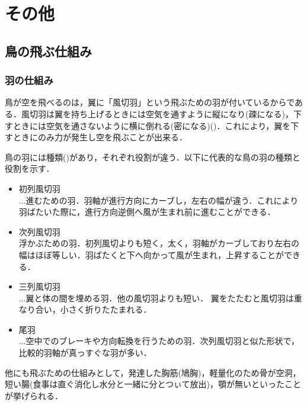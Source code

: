 \chapter[その他]%
    {その他}

\section{鳥の飛ぶ仕組み}
    \subsection{羽の仕組み}
        
        鳥が空を飛べるのは，翼に「風切羽」という飛ぶための羽が付いているからである．風切羽は翼を持ち上げるときには空気を通すように縦になり(疎になる)，下すときには空気を通さないように横に倒れる(密になる)()．これにより，翼を下すときにのみ力が発生し空を飛ぶことが出来る．

        鳥の羽には種類()があり，それぞれ役割が違う．以下に代表的な鳥の羽の種類と役割を示す．

        \begin{itemize}
        \item 初列風切羽\\
            \quad ...進むための羽．羽軸が進行方向にカーブし，左右の幅が違う．これにより羽ばたいた際に，進行方向逆側へ風が生まれ前に進むことができる．

        \item 次列風切羽\\
            \quad 浮かぶための羽．初列風切よりも短く，太く，羽軸がカーブしており左右の幅はほぼ等しい．羽ばたくと下へ向かって風が生まれ，上昇することができる．

        \item 三列風切羽\\
            \quad ...翼と体の間を埋める羽．他の風切羽よりも短い． 翼をたたむと風切羽は重なり合い，小さく折りたたまれる．
            
        \item 尾羽\\
            \quad ...空中でのブレーキや方向転換を行うための羽．次列風切羽と似た形状で，比較的羽軸が真っすぐな羽が多い．
        \end{itemize}

        他にも飛ぶための仕組みとして，発達した胸筋(鳩胸)，軽量化のため骨が空洞，短い腸(食事は直ぐ消化し水分と一緒に分とつぃて放出)，顎が無いといったことが挙げられる．


